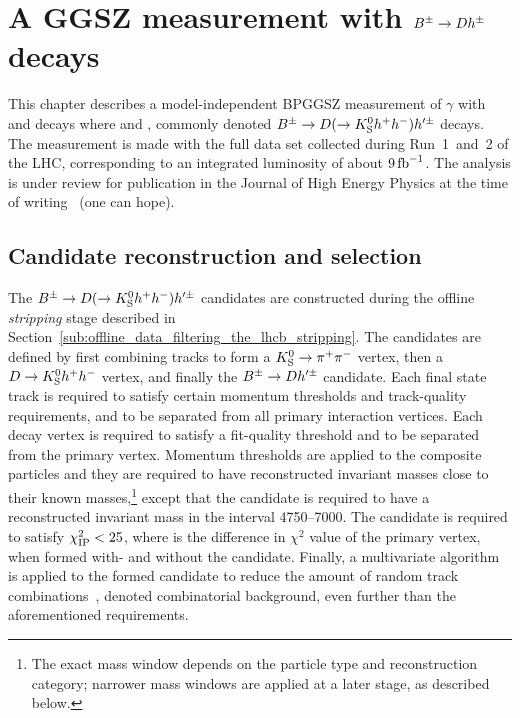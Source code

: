 

\chapter{\texorpdfstring{A GGSZ measurement with ${{B}^\pm}\rightarrow{\ensuremath{D}} h^\pm$ decays}{A GGSZ measurement with B->Dh decays}}
\label{ch:5-GGSZ-measurement}


This chapter describes a model-independent BPGGSZ measurement of $\gamma$ with \BtoDK and \BtoDpi decays where \DtoKspipi and \DtoKsKK, commonly denoted ${{B}^\pm}\rightarrow{\ensuremath{D}}(\rightarrow{\ensuremath{{K}^0_{\mathrm{S}}}} h^+h^-)h'^\pm$ decays. The measurement is made with the full \lhcb data set collected during Run~1~and~2 of the LHC, corresponding to an integrated luminosity of about $9\text{\,fb}^{-1}$. The analysis is under review for publication in the Journal of High Energy Physics at the time of writing~\cite{GGSZ-B2Dh} (one can hope).

\section{Candidate reconstruction and selection} %
\label{sec:candidate_selection}

The ${{B}^\pm}\rightarrow{\ensuremath{D}}(\rightarrow{\ensuremath{{K}^0_{\mathrm{S}}}} h^+h^-)h'^\pm$ candidates are constructed during the offline \emph{stripping} stage described in Section~\ref{sub:offline_data_filtering_the_lhcb_stripping}. The candidates are defined by first combining tracks to form a ${{K}^0_{\mathrm{S}}}\rightarrow{\ensuremath{{\pi}^+}}{\ensuremath{{\pi}^-}}$ vertex, then a ${D}\rightarrow{\ensuremath{{K}^0_{\mathrm{S}}}} h^+h^-$ vertex, and finally the ${{B}^\pm}\rightarrow{\ensuremath{D}} h'^\pm$ candidate. Each final state track is required to satisfy certain momentum thresholds and track-quality requirements, and to be separated from all primary interaction vertices. Each decay vertex is required to satisfy a fit-quality threshold and to be separated from the primary vertex. Momentum thresholds are applied to the composite particles and they are required to have reconstructed invariant masses close to their known masses,\footnote{The exact mass window depends on the particle type and reconstruction category; narrower mass windows are applied at a later stage, as described below.} except that the \B candidate is required to have a reconstructed invariant mass in the interval 4750--7000\mevcc. The \B candidate is required to satisfy $\chi^2_{\text{IP}} <25$, where \ipchisq is the difference in $\chi^2$ value of the primary vertex, when formed with- and without the \B candidate. Finally, a multivariate algorithm is applied to the formed \B candidate to reduce the amount of random track combinations~\cite{}, denoted combinatorial background, even further than the aforementioned requirements.

